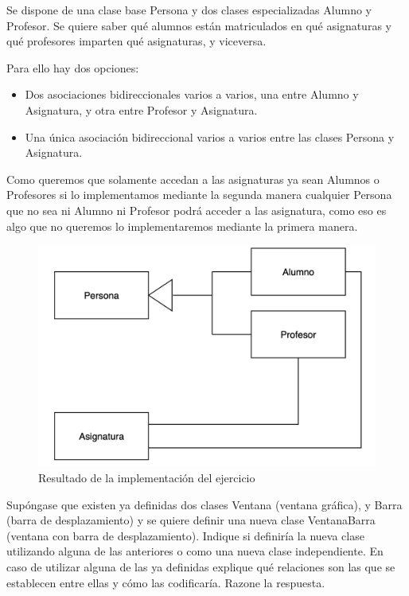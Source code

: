  Se dispone de una clase base Persona y dos clases especializadas Alumno y Profesor. Se quiere saber qué alumnos están matriculados en qué asignaturas y qué profesores imparten qué asignaturas, y viceversa. 

Para ello hay dos opciones:
\begin{itemize}
  \item Dos asociaciones bidireccionales varios a varios, una entre Alumno y Asignatura, y otra entre Profesor y Asignatura.
  \item Una única asociación bidireccional varios a varios entre las clases Persona y Asignatura.
\end{itemize}
Como queremos que solamente accedan a las asignaturas ya sean Alumnos o Profesores si lo implementamos mediante la segunda manera cualquier Persona que no sea ni Alumno ni Profesor podrá acceder a las asignatura, como eso es algo que no queremos lo implementaremos mediante la primera manera.

\begin{figure}[h]
  \begin{center}
    \includegraphics[width=\textwidth]{assets/Seminario3_2_1.png}
  \end{center}
  \caption{Resultado de la implementación del ejercicio}
\end{figure}
\newpage
{} Supóngase que existen ya definidas dos clases Ventana (ventana gráfica), y Barra (barra de desplazamiento) y se quiere definir una nueva clase VentanaBarra (ventana con barra de desplazamiento). Indique si definiría la nueva clase utilizando alguna de las anteriores o como una nueva clase independiente. En caso de utilizar alguna de las ya definidas explique qué relaciones son las que se establecen entre ellas y cómo las codificaría. Razone la respuesta.

